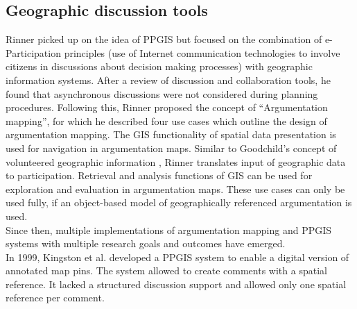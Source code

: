 \subsection{Geographic discussion tools}
\label{zweivier}
Rinner \cite{Rinner_ArgumentationMaps} picked up on the idea of PPGIS but focused on the combination of e-Participation principles (use of Internet communication technologies to involve citizens in discussions about decision making processes) with geographic information systems. After a review of discussion and collaboration tools, he found that asynchronous discussions were not considered during planning procedures. Following this, Rinner proposed the concept of ``Argumentation mapping'', for which he described four use cases which outline the design of argumentation mapping. The GIS functionality of spatial data presentation is used for navigation in argumentation maps. Similar to Goodchild's concept of volunteered geographic information \cite{goodchild2007citizens}, Rinner translates input of geographic data to participation. Retrieval and analysis functions of GIS can be used for exploration and evaluation in argumentation maps. These use cases can only be used fully, if an object-based model of geographically referenced argumentation is used.\\
Since then, multiple implementations of argumentation mapping and PPGIS systems with multiple research goals and outcomes have emerged.\\
In 1999, Kingston et al. \cite{kingston1999gis} developed a PPGIS system to enable a digital version of annotated map pins. The system allowed to create comments with a spatial reference. It lacked a structured discussion support and allowed only one spatial reference per comment.\\
